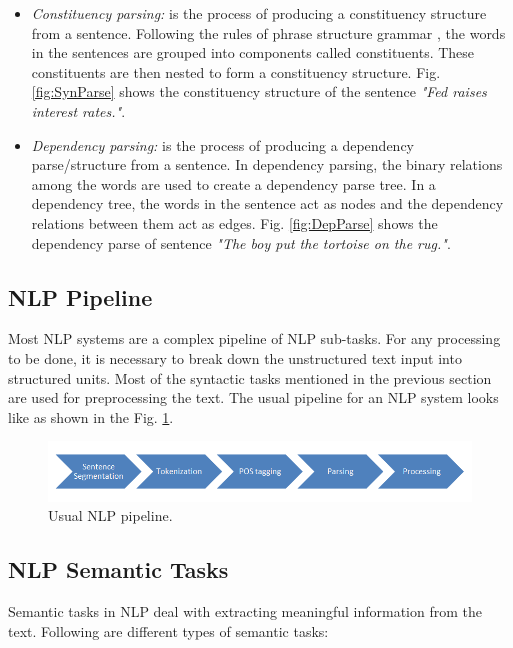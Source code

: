 \begin{itemize}

\item \textit{Constituency parsing:} is the process of producing a constituency structure from a sentence. Following the rules of phrase structure grammar \cite{wiki:phrasegrammar}, the words in the sentences are grouped into components called constituents. These constituents are then nested to form a constituency structure. Fig. \ref{fig:SynParse} shows the constituency structure of the sentence \textit{"Fed raises interest rates."}.

\item \textit{Dependency parsing:} is the process of producing a dependency parse/structure from a sentence. In dependency parsing, the binary relations among the words are used to create a dependency parse tree. In a dependency tree, the words in the sentence act as nodes and the dependency relations between them act as edges. Fig. \ref{fig:DepParse} shows the dependency parse of sentence \textit{"The boy put the tortoise on the rug."}.

\end{itemize}

\subsection{NLP Pipeline}

Most NLP systems are a complex pipeline of NLP sub-tasks. For any processing to be done, it is necessary to break down the unstructured text input into structured units. Most of the syntactic tasks mentioned in the previous section are used for preprocessing the text. The usual pipeline for an NLP system looks like as shown in the Fig. \ref{fig:NLPPipe}.

\begin{figure}
\centering
\includegraphics[scale=0.7]{figures/NLPPipeline.png}
\caption{Usual NLP pipeline.}\label{fig:NLPPipe}
\end{figure}

\subsection{NLP Semantic Tasks}

Semantic tasks in NLP deal with extracting meaningful information from the text. Following are different types of semantic tasks:

